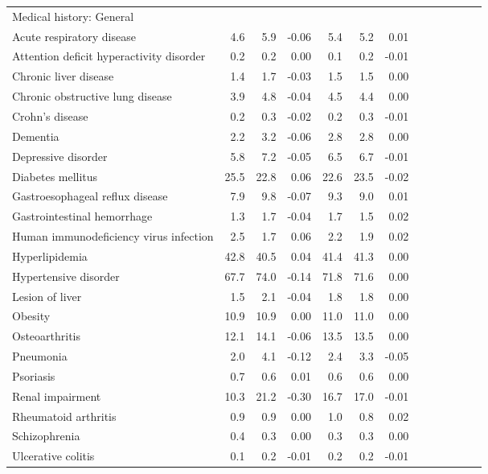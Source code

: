 \documentclass[11pt,]{article}
\begin{document}
\begin{longtable}{lrrrrrrrrrrrr}
  Medical history: General &    &    &     &    &    &     \\ 
      Acute respiratory disease &  4.6 &  5.9 & -0.06 &  5.4 &  5.2 &  0.01 \\ 
      Attention deficit hyperactivity disorder &  0.2 &  0.2 &  0.00 &  0.1 &  0.2 & -0.01 \\ 
      Chronic liver disease &  1.4 &  1.7 & -0.03 &  1.5 &  1.5 &  0.00 \\ 
      Chronic obstructive lung disease &  3.9 &  4.8 & -0.04 &  4.5 &  4.4 &  0.00 \\ 
      Crohn's disease &  0.2 &  0.3 & -0.02 &  0.2 &  0.3 & -0.01 \\ 
      Dementia &  2.2 &  3.2 & -0.06 &  2.8 &  2.8 &  0.00 \\ 
      Depressive disorder &  5.8 &  7.2 & -0.05 &  6.5 &  6.7 & -0.01 \\ 
      Diabetes mellitus & 25.5 & 22.8 &  0.06 & 22.6 & 23.5 & -0.02 \\ 
      Gastroesophageal reflux disease &  7.9 &  9.8 & -0.07 &  9.3 &  9.0 &  0.01 \\ 
      Gastrointestinal hemorrhage &  1.3 &  1.7 & -0.04 &  1.7 &  1.5 &  0.02 \\ 
      Human immunodeficiency virus infection &  2.5 &  1.7 &  0.06 &  2.2 &  1.9 &  0.02 \\ 
      Hyperlipidemia & 42.8 & 40.5 &  0.04 & 41.4 & 41.3 &  0.00 \\ 
      Hypertensive disorder & 67.7 & 74.0 & -0.14 & 71.8 & 71.6 &  0.00 \\ 
      Lesion of liver &  1.5 &  2.1 & -0.04 &  1.8 &  1.8 &  0.00 \\ 
      Obesity & 10.9 & 10.9 &  0.00 & 11.0 & 11.0 &  0.00 \\ 
      Osteoarthritis & 12.1 & 14.1 & -0.06 & 13.5 & 13.5 &  0.00 \\ 
      Pneumonia &  2.0 &  4.1 & -0.12 &  2.4 &  3.3 & -0.05 \\ 
      Psoriasis &  0.7 &  0.6 &  0.01 &  0.6 &  0.6 &  0.00 \\ 
      Renal impairment & 10.3 & 21.2 & -0.30 & 16.7 & 17.0 & -0.01 \\ 
      Rheumatoid arthritis &  0.9 &  0.9 &  0.00 &  1.0 &  0.8 &  0.02 \\ 
      Schizophrenia &  0.4 &  0.3 &  0.00 &  0.3 &  0.3 &  0.00 \\ 
      Ulcerative colitis &  0.1 &  0.2 & -0.01 &  0.2 &  0.2 & -0.01 \\ 

\end{longtable}
\end{document}
